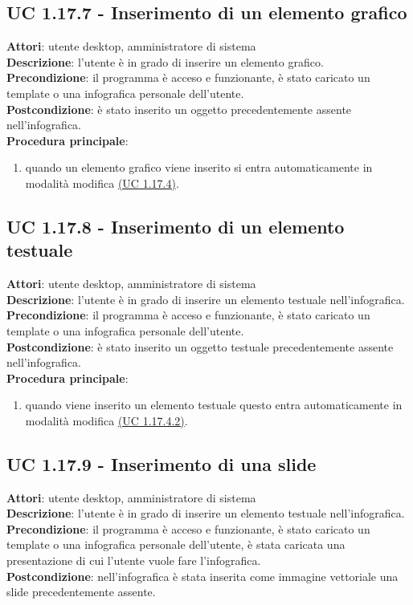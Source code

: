\subsection{UC 1.17.7 - Inserimento di un elemento grafico}{
	\label{uc1.17.7}
	\textbf{Attori}: utente desktop, amministratore di sistema \\
	\textbf{Descrizione}: l'utente è in grado di inserire un elemento grafico. \\
	\textbf{Precondizione}: il programma è acceso e funzionante, è stato caricato un template o una infografica personale dell'utente.	\\
	\textbf{Postcondizione}: è stato inserito un oggetto precedentemente assente nell'infografica.	\\
	\textbf{Procedura principale}:
	\begin{enumerate}
		\item quando un elemento grafico viene inserito si entra automaticamente in modalità modifica \hyperref[uc1.17.4]{(UC 1.17.4)}.
	\end{enumerate}
	}
\subsection{UC 1.17.8 - Inserimento di un elemento testuale}{
	\label{uc1.17.8}
	\textbf{Attori}: utente desktop, amministratore di sistema \\
	\textbf{Descrizione}: l'utente è in grado di inserire un elemento testuale nell'infografica. \\
	\textbf{Precondizione}: il programma è acceso e funzionante, è stato caricato un template o una infografica personale dell'utente.	\\
	\textbf{Postcondizione}: è stato inserito un oggetto testuale precedentemente assente nell'infografica.	\\
	\textbf{Procedura principale}:
	\begin{enumerate}
		\item quando viene inserito un elemento testuale questo entra automaticamente in modalità modifica \hyperref[uc1.17.4.2]{(UC 1.17.4.2)}.
	\end{enumerate}
	}
\subsection{UC 1.17.9 - Inserimento di una slide}{
	\label{uc1.17.9}
	\textbf{Attori}: utente desktop, amministratore di sistema \\
	\textbf{Descrizione}: l'utente è in grado di inserire un elemento testuale nell'infografica. \\
	\textbf{Precondizione}: il programma è acceso e funzionante, è stato caricato un template o una infografica personale dell'utente, è stata caricata una presentazione di cui l'utente vuole fare l'infografica.	\\
	\textbf{Postcondizione}: nell'infografica è stata inserita come immagine vettoriale una slide precedentemente assente.	\\
	}